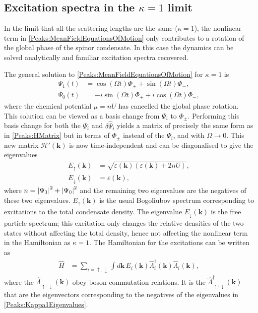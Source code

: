 \subsection{Excitation spectra in the $\kappa = 1$ limit}
In the limit that all the scattering lengths are the same ($\kappa = 1$), the nonlinear term in \eqref{Peaks:MeanFieldEquationsOfMotion} only contributes to a rotation of the global phase of the spinor condensate. In this case the dynamics can be solved analytically and familiar excitation spectra recovered.

The general solution to \eqref{Peaks:MeanFieldEquationsOfMotion} for $\kappa = 1$ is
\begin{subequations}
    \label{Peaks:Kappa1MeanFieldSolution}
    \begin{align}
        \Psi_1(t) &= \cos(\Omega t) \Phi_+ + \sin(\Omega t) \Phi_-, \\
        \Psi_0(t) &= -i\sin(\Omega t) \Phi_+ + i\cos(\Omega t) \Phi_-,
    \end{align}
\end{subequations}
where the chemical potential $\mu = n U$ has cancelled the global phase rotation. This solution can be viewed as a basis change from $\Psi_i$ to $\Phi_\pm$. Performing this basis change for both the $\Psi_i$ and $\delta \hat{\Psi}_i$ yields a  matrix of precisely the same form as in \eqref{Peaks:HMatrix} but in terms of $\Phi_\pm$ instead of the $\Psi_i$, and with $\Omega \rightarrow 0$. This new matrix $\mathcal{H}'(\mathbf{k})$ is now time-independent and can be diagonalised to give the eigenvalues
\begin{subequations}
    \label{Peaks:Kappa1Eigenvalues}
    \begin{align}
        E_\uparrow(\mathbf{k}) &= \sqrt{\varepsilon(\mathbf{k})\left(\varepsilon(\mathbf{k}) + 2 n U\right)},\\
        E_\downarrow(\mathbf{k}) &= \varepsilon(\mathbf{k}),
    \end{align}
\end{subequations}
where $n= \left|\Psi_1\right|^2 + \left|\Psi_0\right|^2$ and the remaining two eigenvalues are the negatives of these two eigenvalues. $E_\uparrow(\mathbf{k})$ is the usual Bogoliubov spectrum \citep{Bogoliubov:1947} corresponding to excitations to the total condensate density. The eigenvalue $E_\downarrow(\mathbf{k})$ is the free particle spectrum; this excitation only changes the relative densities of the two states without affecting the total density, hence not affecting the nonlinear term in the Hamiltonian as $\kappa = 1$. The Hamiltonian for the excitations can be written as
\begin{align}
    \hat{H} &= \sum_{i=\uparrow,\downarrow}\int d\mathbf{k}\, E_i(\mathbf{k}) \hat{\Lambda}_i^\dagger(\mathbf{k}) \hat{\Lambda}_i(\mathbf{k}),
\end{align}
where the $\hat{\Lambda}_{\uparrow,\downarrow}(\mathbf{k})$ obey boson commutation relations. It is the $\hat{\Lambda}_{\uparrow, \downarrow}^\dagger(\mathbf{k})$ that are the eigenvectors corresponding to the negatives of the eigenvalues in \eqref{Peaks:Kappa1Eigenvalues}.

